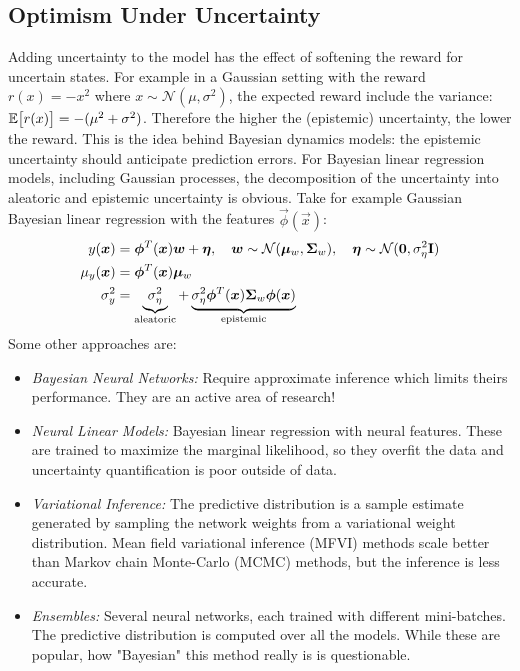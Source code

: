 		\subsection{Optimism Under Uncertainty}
			Adding uncertainty to the model has the effect of softening the reward for uncertain states. For example in a Gaussian setting with the reward \( r(x) = -x^2 \) where \( x \sim \mathcal{N}(\mu, \sigma^2) \), the expected reward include the variance: \( \mathbb{E}\big[r(x)\big] = -(\mu^2 +\sigma^2) \). Therefore the higher the (epistemic) uncertainty, the lower the reward. This is the idea behind Bayesian dynamics models: the epistemic uncertainty should anticipate prediction errors. For Bayesian linear regression models, including Gaussian processes, the decomposition of the uncertainty into aleatoric and epistemic uncertainty is obvious. Take for example Gaussian Bayesian linear regression with the features \( \vec{\phi}(\vec{x}) \):
			\begin{align*}
				y(\bm{x}) &= \bm{\phi}^T(\bm{x}) \bm{w} + \bm{\eta},\quad
					\bm{w} \sim \mathcal{N}(\bm{\mu}_w, \bm{\mathrm{\Sigma}}_w),\quad
					\bm{\eta} \sim \mathcal{N}(\bm{0}, \sigma_\eta^2 \bm{\mathrm{I}}) \\
				\mu_y(\bm{x}) &= \bm{\phi}^T(\bm{x}) \bm{\mu}_w \\
				\sigma_y^2 &= \underbrace{\sigma_\eta^2}_\text{aleatoric} + \underbrace{\sigma_\eta^2 \bm{\phi}^T(\bm{x}) \bm{\mathrm{\Sigma}}_w \bm{\phi}(\bm{x})}_\text{epistemic}
			\end{align*}
			Some other approaches are:
			\begin{itemize}
				\item \emph{Bayesian Neural Networks:} Require approximate inference which limits theirs performance. They are an active area of research!
				\item \emph{Neural Linear Models:} Bayesian linear regression with neural features. These are trained to maximize the marginal likelihood, so they overfit the data and uncertainty quantification is poor outside of data.
				\item \emph{Variational Inference:} The predictive distribution is a sample estimate generated by sampling the network weights from a variational weight distribution. Mean field variational inference (MFVI) methods scale better than Markov chain Monte-Carlo (MCMC) methods, but the inference is less accurate.
				\item \emph{Ensembles:} Several neural networks, each trained with different mini-batches. The predictive distribution is computed over all the models. While these are popular, how "Bayesian" this method really is is questionable.
			\end{itemize}

